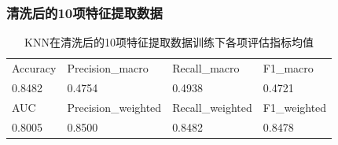 \documentclass[10pt]{article}
\begin{document}
\subsubsection*{清洗后的10项特征提取数据}
\begin{table}[H]
  \centering
  \caption{KNN在清洗后的10项特征提取数据训练下各项评估指标均值}
  \begin{tabular}{llll}
  \toprule
  Accuracy & Precision\_macro & Recall\_macro & F1\_macro \\
  0.8482 & 0.4754 & 0.4938 & 0.4721 \\
  \midrule
  AUC & Precision\_weighted & Recall\_weighted & F1\_weighted \\
  0.8005 & 0.8500 & 0.8482 & 0.8478 \\
  \bottomrule
  \end{tabular}
\end{table}
\end{document}

